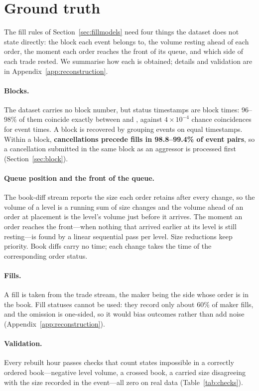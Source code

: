 \section{Ground truth}
\label{sec:reconstruction}

The fill rules of Section~\ref{sec:fillmodels} need four things the dataset does
not state directly: the block each event belongs to, the volume resting ahead of
each order, the moment each order reaches the front of its queue, and which side
of each trade rested. We summarise how each is obtained; details and validation
are in Appendix~\ref{app:reconstruction}.

\paragraph{Blocks.}
The dataset carries no block number, but status timestamps are block times:
96--98\% of them coincide exactly between \BTC{} and \SOL, against $4\times10^{-4}$
chance coincidences for event times. A block is recovered by grouping events on
equal timestamps. Within a block, \textbf{cancellations precede fills in
98.8--99.4\% of event pairs}, so a cancellation submitted in the same block as an
aggressor is processed first (Section~\ref{sec:block}).

\paragraph{Queue position and the front of the queue.}
\label{sec:queue}
The book-diff stream reports the size each order retains after every change, so
the volume of a level is a running sum of size changes and the volume ahead of
an order at placement is the level's volume just before it arrives. The moment
an order reaches the front---when nothing that arrived earlier at its level is
still resting---is found by a linear sequential pass per level. Size reductions
keep priority. Book diffs carry no time; each change takes the time of the
corresponding order status.

\paragraph{Fills.}
A fill is taken from the trade stream, the maker being the side whose order is in
the book. Fill statuses cannot be used: they record only about 60\% of maker
fills, and the omission is one-sided, so it would bias outcomes rather than add
noise (Appendix~\ref{app:reconstruction}).

\paragraph{Validation.}
Every rebuilt hour passes checks that count states impossible in a correctly
ordered book---negative level volume, a crossed book, a carried size disagreeing
with the size recorded in the event---all zero on real data
(Table~\ref{tab:checks}).
